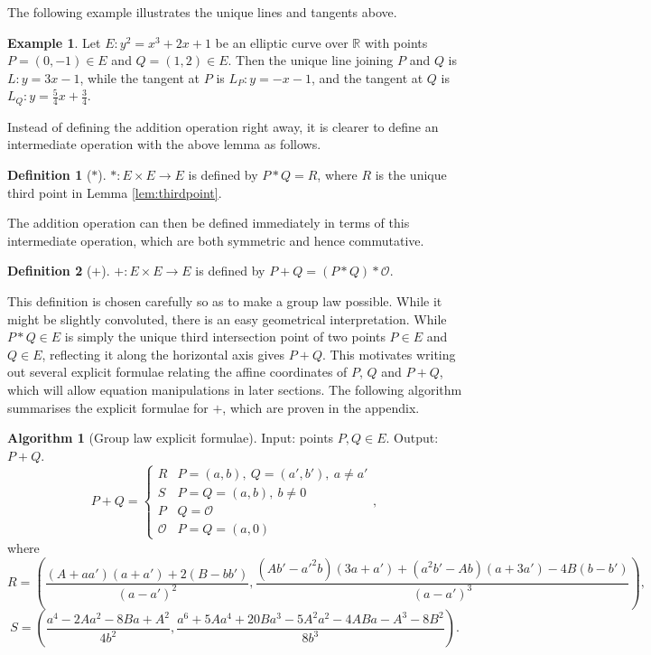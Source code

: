 \documentclass{article}
\newcommand{\R}{\mathbb{R}}
\newcommand{\rb}[1]{\left( #1 \right)}
\theoremstyle{definition}
\newtheorem*{definition}{Definition}
\newtheorem*{example}{Example}
\newtheorem{algorithm}[proposition]{Algorithm}
\begin{document}
The following example illustrates the unique lines and tangents above.

\begin{example}
Let $ E : y^2 = x^3 + 2x + 1 $ be an elliptic curve over $ \R $ with points $ P = \rb{0, -1} \in E $ and $ Q = \rb{1, 2} \in E $. Then the unique line joining $ P $ and $ Q $ is $ L : y = 3x - 1 $, while the tangent at $ P $ is $ L_P : y = -x - 1 $, and the tangent at $ Q $ is $ L_Q : y = \tfrac{5}{4}x + \tfrac{3}{4} $.
\end{example}

Instead of defining the addition operation right away, it is clearer to define an intermediate operation with the above lemma as follows.

\begin{definition}[$ * $]
$ * : E \times E \to E $ is defined by $ P * Q = R $, where $ R $ is the unique third point in Lemma \ref{lem:thirdpoint}.
\end{definition}

The addition operation can then be defined immediately in terms of this intermediate operation, which are both symmetric and hence commutative.

\begin{definition}[$ + $]
$ + : E \times E \to E $ is defined by $ P + Q = \rb{P * Q} * \mathcal{O} $.
\end{definition}

This definition is chosen carefully so as to make a group law possible. While it might be slightly convoluted, there is an easy geometrical interpretation. While $ P * Q \in E $ is simply the unique third intersection point of two points $ P \in E $ and $ Q \in E $, reflecting it along the horizontal axis gives $ P + Q $. This motivates writing out several explicit formulae relating the affine coordinates of $ P $, $ Q $ and $ P + Q $, which will allow equation manipulations in later sections. The following algorithm summarises the explicit formulae for $ + $, which are proven in the appendix.

\begin{algorithm}[Group law explicit formulae]
Input: points $ P, Q \in E $. Output: $ P + Q $.
$$ P + Q = \begin{cases} R & P = \rb{a, b}, \ Q = \rb{a', b'}, \ a \ne a' \\ S & P = Q = \rb{a, b}, \ b \ne 0 \\ P & Q = \mathcal{O} \\ \mathcal{O} & P = Q = \rb{a, 0} \end{cases}, $$
where
$$ R = \rb{\dfrac{\rb{A + aa'}\rb{a + a'} + 2\rb{B - bb'}}{\rb{a - a'}^2}, \dfrac{\rb{Ab' - a'^2b}\rb{3a + a'} + \rb{a^2b' - Ab}\rb{a + 3a'} - 4B\rb{b - b'}}{\rb{a - a'}^3}}, $$
$$ S = \rb{\dfrac{a^4 - 2Aa^2 - 8Ba + A^2}{4b^2}, \dfrac{a^6 + 5Aa^4 + 20Ba^3 - 5A^2a^2 - 4ABa - A^3 - 8B^2}{8b^3}}. $$
\end{algorithm}
\end{document}
